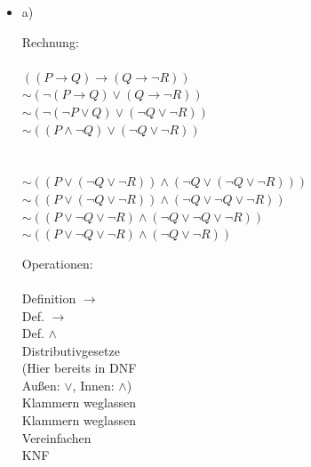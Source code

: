 \documentclass[a4paper]{scrartcl}
\begin{document}
\begin{itemize}
    \item a)\\
        \begin{minipage}[t]{0.55\textwidth}
            Rechnung:\\
            \\
            $((P \rightarrow Q) \rightarrow (Q \rightarrow \neg R))$\\
            $\sim (\neg (P \rightarrow Q) \lor (Q \rightarrow \neg R))$\\
            $\sim (\neg (\neg P \lor Q) \lor (\neg Q \lor \neg R))$\\
            $\sim ((P \land \neg Q) \lor (\neg Q \lor \neg R))$\\
            \\
            \\
            $\sim ((P \lor (\neg Q \lor \neg R)) \land (\neg Q \lor (\neg Q \lor \neg R)))$\\
            $\sim ((P \lor (\neg Q \lor \neg R)) \land (\neg Q \lor \neg Q \lor \neg R))$\\
            $\sim ((P \lor \neg Q \lor \neg R) \land (\neg Q \lor \neg Q \lor \neg R))$\\
            $\sim ((P \lor \neg Q \lor \neg R) \land (\neg Q \lor \neg R))$\\
        \end{minipage}
        \begin{minipage}[t]{0.4\textwidth}
            Operationen:\\
            \\
            Definition $\rightarrow$\\
            Def. $\rightarrow$\\
            Def. $\land$\\
            Distributivgesetze\\
            (Hier bereits in DNF\\
            Außen: $\lor$, Innen: $\land$)\\
            Klammern weglassen\\
            Klammern weglassen\\
            Vereinfachen\\
            KNF

        \end{minipage}

\newpage


\end{itemize}
\end{document}
